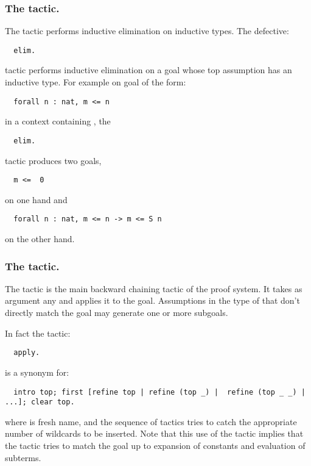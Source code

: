 \subsubsection*{The  tactic.} 

The  tactic performs
inductive elimination on inductive types.
The defective:
\begin{lstlisting}
  elim.
\end{lstlisting}
tactic performs inductive elimination on a goal whose top assumption
has an inductive type. For example on goal of the form:
\begin{lstlisting}
  forall n : nat, m <= n
\end{lstlisting}
 in a context containing , the
\begin{lstlisting}
  elim.
\end{lstlisting}
tactic produces two goals,
\begin{lstlisting}
  m <=  0
\end{lstlisting}
on one hand and
\begin{lstlisting}
  forall n : nat, m <= n -> m <= S n
\end{lstlisting}
on the other hand.


\subsubsection*{The  tactic.}\label{sssec:apply}

The  tactic is the main
backward chaining tactic of the proof system. It takes as argument any
 and applies it to the goal.
Assumptions in the type of  that don't directly match the
goal may generate one or more subgoals.

In fact the \ssr{} tactic:
\begin{lstlisting}
  apply.
\end{lstlisting}
is a synonym for:
\begin{lstlisting}
  intro top; first [refine top | refine (top _) |  refine (top _ _) | ...]; clear top.
\end{lstlisting}
where  is fresh name, and the sequence of  tactics
tries to catch the appropriate number of wildcards to be inserted.
Note that this use of the  tactic implies that the tactic
tries to match the goal up to expansion of
constants and evaluation of subterms.

